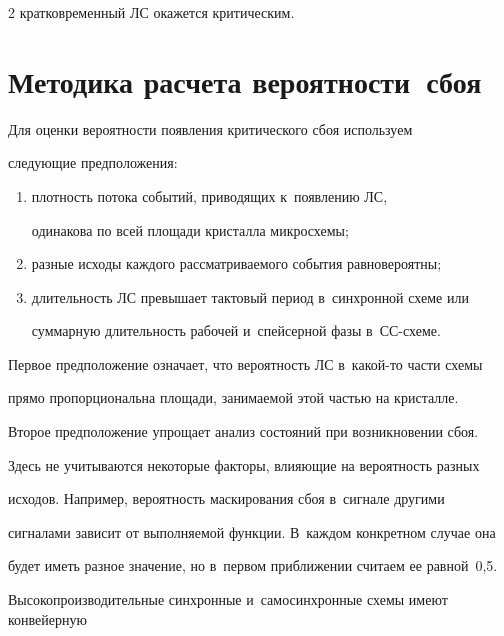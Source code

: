 \begin{multicols}{2}
кратковременный ЛС окажется критическим.

  

\section{Методика расчета вероятности~сбоя}



  Для оценки вероятности появления критического сбоя используем 

следующие предположения:





\noindent

  \begin{enumerate}[(1)]

\item плотность потока событий, приводящих к~появлению ЛС, 

одинакова по всей площади крис\-тал\-ла микросхемы;

\item разные исходы каждого рассматриваемого события равновероятны;

\item длительность ЛС превышает тактовый период в~синхронной схеме или 

суммарную длительность рабочей и~спейсерной фазы в~СС-схеме. 

\end{enumerate}



  Первое предположение означает, что вероятность ЛС в~какой-то части схемы 

прямо пропорциональна площади, занимаемой этой частью на кристалле.

  

  Второе предположение упрощает анализ со\-сто\-яний при возникновении сбоя. 

Здесь не учитываются некоторые факторы, вли\-я\-ющие на ве\-ро\-ят\-ность разных 

исходов. Например, ве\-ро\-ят\-ность маскирования сбоя в~сигнале другими 

сигналами зависит от вы\-пол\-ня\-емой функции. В~каж\-дом конкретном случае она 

будет иметь разное значение, но в~пер\-вом при\-бли\-же\-нии считаем ее равной~0,5.

  

  Высокопроизводительные синхронные и~самосинхронные схемы имеют конвейерную 


\end{multicols}
